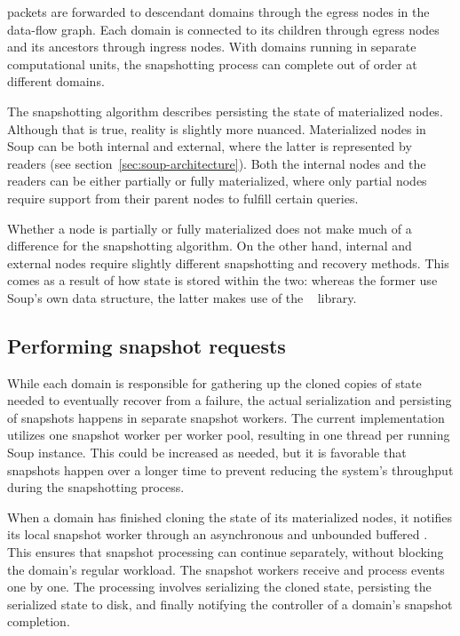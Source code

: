 packets are forwarded to descendant domains through the
egress nodes in the data-flow graph. Each domain is connected to its children
through egress nodes and its ancestors through ingress nodes. With domains
running in separate computational units, the snapshotting process can complete
out of order at different domains.


The snapshotting algorithm describes persisting the state of materialized nodes.
Although that is true, reality is slightly more nuanced. Materialized nodes in
Soup can be both internal and external, where the latter is represented by
readers (see section~\ref{sec:soup-architecture}). Both the internal nodes and
the readers can be either partially or fully materialized, where only partial
nodes require support from their parent nodes to fulfill certain queries.

Whether a node is partially or fully materialized does not make much of a
difference for the snapshotting algorithm. On the other hand, internal and
external nodes require slightly different snapshotting and recovery methods.
This comes as a result of how state is stored within the two: whereas the former
use Soup's own  data structure, the latter makes use of the
~\cite{evmap} library.

\subsection{Performing snapshot requests}

While each domain is responsible for gathering up the cloned copies of state
needed to eventually recover from a failure, the actual serialization and
persisting of snapshots happens in separate snapshot workers. The current
implementation utilizes one snapshot worker per worker pool, resulting in one
thread per running Soup instance. This could be increased as needed, but it is
favorable that snapshots happen over a longer time to prevent reducing the
system's throughput during the snapshotting process.

When a domain has finished cloning the state of its materialized nodes, it
notifies its local snapshot worker through an asynchronous and unbounded
buffered
.
This ensures that snapshot processing can continue separately, without blocking
the domain's regular workload. The snapshot workers receive and process
 events one by one. The processing involves
serializing the cloned state, persisting the serialized state to disk, and
finally notifying the controller of a domain's snapshot completion.

